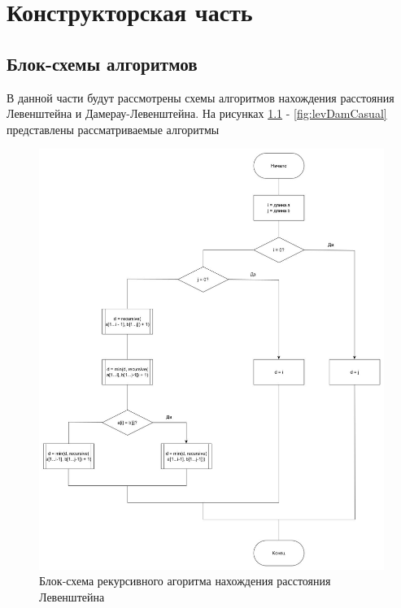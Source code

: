 \documentclass[12pt]{report}
\begin{document}
    \chapter{Конструкторская часть}


    \section{Блок-схемы алгоритмов}
    В данной части будут рассмотрены схемы алгоритмов нахождения расстояния Левенштейна и Дамерау-Левенштейна.
    На рисунках \ref{fig:levRecur} - \ref{fig:levDamCasual} представлены рассматриваемые алгоритмы

    \begin{figure}[H]
        \centering
        \includegraphics[width=0.7\linewidth]{img/levRecur}
        \caption{Блок-схема рекурсивного агоритма нахождения расстояния Левенштейна}
        \label{fig:levRecur}
    \end{figure}
\end{document}
